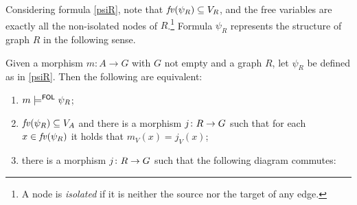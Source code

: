 Considering formula \eqref{psiR}, note that $\mathit{fv}(\psi_R) \subseteq V_R$, and the free variables are exactly all the non-isolated nodes of $R$.\footnote{A node is \emph{isolated} if it is neither the source nor the target of any edge.} Formula $\psi_R$ represents the structure of graph $R$ in the following sense.
\begin{lemma}
  \label{lem:psi-R}
Given a morphism $m: A \to G$ with $G$ not empty and a graph $R$, let $\psi_R$ be defined as in \eqref{psiR}. Then the following are equivalent:
\begin{enumerate} 
  \item $m \models^{\mathsf{FOL}} \psi_R$;
  \item $\mathit{fv}(\psi_R) \subseteq V_A$ and there is a morphism $j \colon R \rightarrow G$ such that for each $x \in \mathit{fv}(\psi_R)$ it holds that $m_V(x) = j_V(x)$;
  \item there is a morphism $j \colon R \rightarrow G$ such that the following diagram commutes:
\begin{center}
\end{center} 
\end{enumerate}
\end{lemma}

